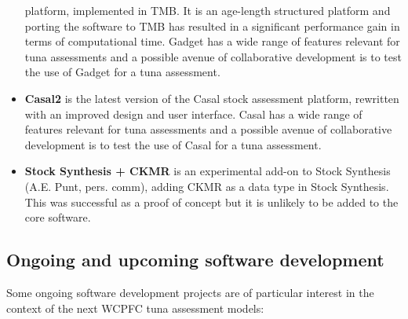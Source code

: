 \documentclass{SCreport}
\begin{document}
\begin{itemize}
  platform, implemented in TMB. It is an age-length structured platform and
  porting the software to TMB has resulted in a significant performance gain in
  terms of computational time. Gadget has a wide range of features relevant for
  tuna assessments and a possible avenue of collaborative development is to test
  the use of Gadget for a tuna assessment.
  \item \textbf{Casal2} is the latest version of the Casal stock assessment
  platform, rewritten with an improved design and user interface. Casal has a
  wide range of features relevant for tuna assessments and a possible avenue of
  collaborative development is to test the use of Casal for a tuna assessment.
  \item \textbf{Stock Synthesis + CKMR} is an experimental add-on to Stock
  Synthesis (A.E. Punt, pers. comm), adding CKMR as a data type in Stock
  Synthesis. This was successful as a proof of concept but it is unlikely to be
  added to the core software.
\end{itemize}

\subsection{Ongoing and upcoming software development}
\label{sec:ongoing-upcoming-development}

Some ongoing software development projects are of particular interest in the
context of the next WCPFC tuna assessment models:
\end{document}

